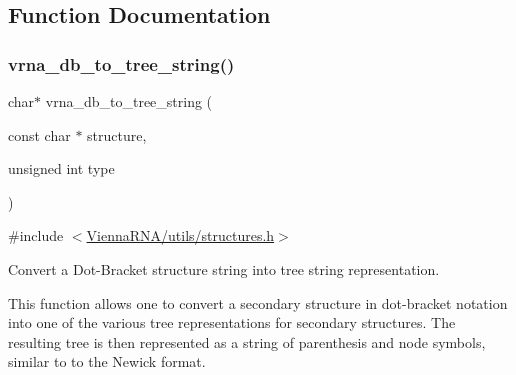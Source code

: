 \subsection{Function Documentation}
\mbox{\label{group__struct__utils__tree_ga56551ab7da64933a7230d29430f40cfe}} 
\subsubsection{\texorpdfstring{vrna\_db\_to\_tree\_string()}{vrna\_db\_to\_tree\_string()}}
{\footnotesize\ttfamily char$\ast$ vrna\+\_\+db\+\_\+to\+\_\+tree\+\_\+string (\begin{DoxyParamCaption}\item[{const char $\ast$}]{structure,  }\item[{unsigned int}]{type }\end{DoxyParamCaption})}



{\ttfamily \#include $<$\mbox{\hyperlink{utils_2structures_8h}{Vienna\+R\+N\+A/utils/structures.\+h}}$>$}



Convert a Dot-\/\+Bracket structure string into tree string representation. 

This function allows one to convert a secondary structure in dot-\/bracket notation into one of the various tree representations for secondary structures. The resulting tree is then represented as a string of parenthesis and node symbols, similar to to the Newick format.

